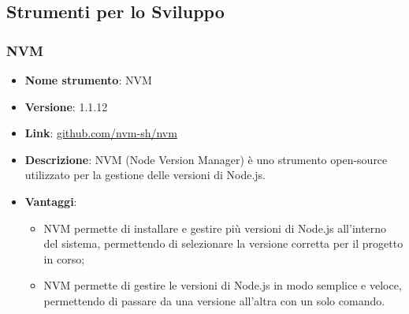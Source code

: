 \subsection{Strumenti per lo Sviluppo}

\subsubsection{NVM}
\begin{itemize}
      \item \textbf{Nome strumento}: NVM
      \item \textbf{Versione}: 1.1.12
      \item \textbf{Link}: \href{https://github.com/nvm-sh/nvm}{github.com/nvm-sh/nvm}
      \item \textbf{Descrizione}: NVM (Node Version Manager) è uno strumento open-source utilizzato per la gestione delle versioni di Node.js.
      \item \textbf{Vantaggi}:
            \begin{itemize}
                  \item NVM permette di installare e gestire più versioni di Node.js all'interno del sistema, permettendo di selezionare la versione corretta
                        per il progetto in corso;
                  \item NVM permette di gestire le versioni di Node.js in modo semplice e veloce, permettendo di passare da una versione all'altra con un solo comando.
            \end{itemize}
\end{itemize}

